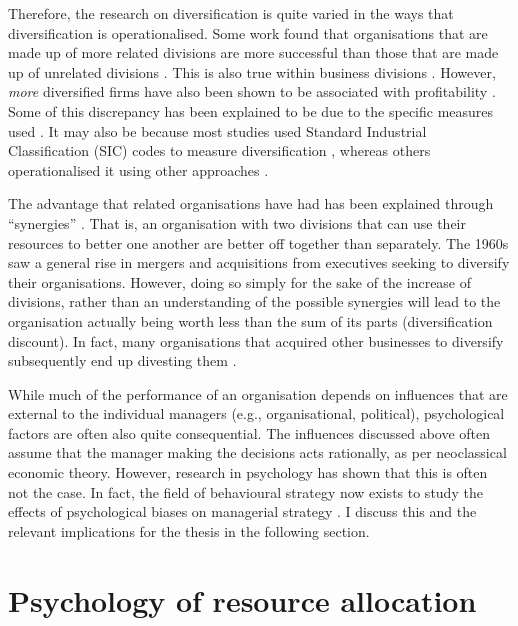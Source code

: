 \documentclass[a4paper, nobind, dvipsnames]{templates/ociamthesis}
\theoremstyle{definition}
\theoremstyle{definition}
\theoremstyle{definition}
\theoremstyle{definition}
\theoremstyle{remark}
\begin{document}
Therefore, the research on diversification is quite varied in the ways that
diversification is operationalised. Some work found that organisations that are
made up of more related divisions are more successful than those that are made
up of unrelated divisions \autocite{harrison1993,rumelt1974,shelton1988,wernerfelt1988}. This is also true within business divisions \autocite{davis1992}.
However, \emph{more} diversified firms have also been shown to be associated with
profitability \autocite{grant1988}. Some of this discrepancy has been explained to be
due to the specific measures used \autocite{lubatkin1986}. It may also be because most
studies used Standard Industrial Classification (SIC) codes to measure
diversification \autocite[e.g.,][]{rumelt1974}, whereas others operationalised it using
other approaches \autocite[e.g., resource-based;][]{harrison1993}.

The advantage that related organisations have had has been explained through
``synergies'' \autocite{barney1988}. That is, an organisation with two divisions that can
use their resources to better one another are better off together than
separately. The 1960s saw a general rise in mergers and acquisitions from
executives seeking to diversify their organisations. However, doing so simply
for the sake of the increase of divisions, rather than an understanding of the
possible synergies will lead to the organisation actually being worth less than
the sum of its parts (diversification discount). In fact, many organisations
that acquired other businesses to diversify subsequently end up divesting them
\autocite{porter1987}.

While much of the performance of an organisation depends on influences that are
external to the individual managers (e.g., organisational, political),
psychological factors are often also quite consequential. The influences
discussed above often assume that the manager making the decisions acts
rationally, as per neoclassical economic theory. However, research in psychology
has shown that this is often not the case. In fact, the field of behavioural
strategy now exists to study the effects of psychological biases on managerial
strategy \autocite{powell2011}. I discuss this and the relevant implications for the
thesis in the following section.

\hypertarget{psychology-of-resource-allocation}{%
\section{Psychology of resource allocation}\label{psychology-of-resource-allocation}}
\end{document}
